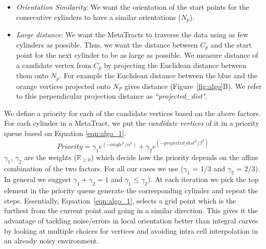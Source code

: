 \begin{itemize}
\item \textit{Orientation Similarity}: We want the orientation of the start points for the consecutive cylinders to have a similar orientations ($N_p$). 
\item \textit{Large distance}: We want the MetaTracts to traverse the data using as few cylinders as possible. Thus, we want the distance between $C_p$ and the start point for the next cylinder to be as large as possible. We measure distance of a candidate vertex from $C_p$ by projecting the Euclidean distance between them onto $N_p$. For example the Euclidean distance between the blue and the orange vertices projected onto $N_P$ gives distance (Figure~\ref{fig:algo}B). We refer to this perpendicular projection distance as \textit{``projected\_dist"}. 
\end{itemize}
We define a priority for each of the candidate vertices based on the above factors.
For each cylinder in a MetaTract, we put the \textit{candidate vertices} of it in a priority queue based on Equation \ref{eqn:algo_1}.
\begin{equation}
Priority = \gamma_1 e^{(-angle^2 / \alpha^2)} + \gamma_2e^{(-projected\_dist^2 / \beta^2)}
\label{eqn:algo_1}
\end{equation}
$\gamma_1$, $\gamma_2$ are the  weights ($\mathbb{R}_{\ge 0}$)  which decide how the priority depends on the affine combination of the two factors. For all our cases we use ($\gamma_1$ = $1 / 3 $ and $\gamma_2$ = $2 / 3$). In general we suggest $\gamma_1 +\gamma_2 = 1 $ and $\gamma_1 \leq \gamma_2$). At each iteration we pick the top element in the priority queue generate the corresponding cylinder and repeat the steps. Essentially, Equation~\ref{eqn:algo_1}, selects a grid point which is the furthest from the current point and going in a similar direction. This gives it the advantage of tackling noise/errors in local orientation better than integral curves by looking at multiple choices for vertices and avoiding intra cell interpolation in an already noisy environment. 
 
